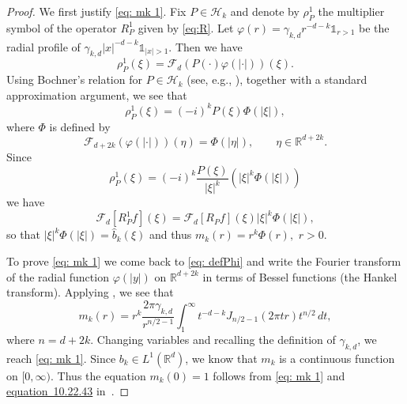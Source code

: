 \documentclass[a4paper,12pt,reqno]{amsart}
\numberwithin{equation}{section}
\theoremstyle{definition}
\newcommand{\ind}{\mathbb{1}}
\newcommand{\R}{\mathbb{R}}
\newcommand{\mH}{\mathcal{H}}
\newcommand{\mF}{\mathcal{F}}
\newcommand{\abs}[1]{\left\lvert #1 \right\rvert}
\begin{document}
\begin{proof}
We first justify \eqref{eq: mk 1}. Fix $P\in \mH_k$ and denote by $\rho_P^1$ the multiplier symbol of the operator $R_P^1$ given by \eqref{eq:R}. Let $\varphi(r) = \gamma_{k,d}r^{-d-k}\ind_{r > 1}$ be the radial profile of $\gamma_{k,d}|x|^{-d-k}\ind{_{|x|>1}}$. Then we have
\[
\rho_P^1(\xi)=\mF_{d}(P(\cdot)\varphi(|\cdot|))(\xi).
\]
 Using Bochner's relation for $P\in \mH_k$ (see, e.g., \cite[Corollary p.72]{stein}), together with a standard approximation argument, we see that
\[
\rho_P^1(\xi)=(-i)^k P(\xi)\Phi(\abs{\xi}),
\]
where $\Phi$ is defined by
\begin{equation}
\label{eq: defPhi}
\mF_{d+2k}(\varphi(|\cdot|))(\eta)=\Phi(|\eta|),\qquad \eta\in \R^{d+2k}.
\end{equation}
Since 
\[
\rho_P^1(\xi)=(-i)^k \frac{P(\xi)}{|\xi|^k}(|\xi|^k\Phi(\abs{\xi}))
\]
we have
\[
\mF_d[R_P^1 f](\xi)=\mF_d[R_P f](\xi)|\xi|^k\Phi(\abs{\xi}),
\]
so that
$|\xi|^k\Phi(
\abs{\xi})=\widehat{b}_k(\xi)$ and thus $m_k(r)=r^k\Phi(r),$ $r>0.$

To prove \eqref{eq: mk 1} we come back to \eqref{eq: defPhi} and write the Fourier transform of the radial function $\varphi(|y|)$ on $\R^{d+2k}$ in terms of Bessel functions (the Hankel transform). Applying \cite[Section B.5]{grafakos}, we see that
\[
 m_k(r) = r^k\frac{2\pi \gamma_{k,d}}{r^{n/2-1}} \int_1^\infty t^{-d-k} J_{n/2 - 1}(2\pi tr) t^{n/2} \, dt, 
\]
where $n=d+2k.$ Changing variables and recalling the definition of $\gamma_{k,d}$, we reach \eqref{eq: mk 1}. Since $b_k\in L^1(\R^d)$, we know that  $m_k$ is a continuous function on $[0,\infty).$ Thus the equation $m_k(0)=1$ follows from \eqref{eq: mk 1} and \href{https://dlmf.nist.gov/10.22.E43}{equation~10.22.43} in~\cite{dlmf}. 


\end{proof}
\end{document}

